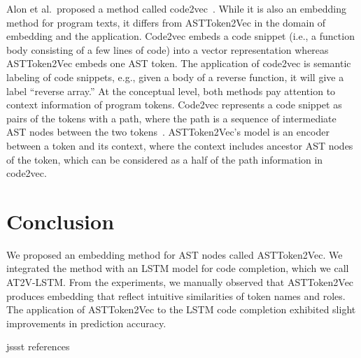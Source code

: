 \documentclass[E]{compsoft}
\begin{document}
Alon et al.~proposed a method called code2vec~\cite{alon2019popl}.  While it is also an embedding method for program texts, it differs from ASTToken2Vec in the domain of embedding and the application.  Code2vec embeds a code snippet (i.e., a function body consisting of a few lines of code) into a vector representation whereas ASTToken2Vec embeds one AST token.  The application of code2vec is semantic labeling of code snippets, e.g., given a body of a reverse function, it will give a label ``reverse array.''  At the conceptual level, both methods pay attention to context information of program tokens.  Code2vec represents a code snippet as pairs of the tokens with a path, where the path is a sequence of intermediate AST nodes between the two tokens~\cite{alon2018pldi}.  ASTToken2Vec's model is an encoder between a token and its context, where the context includes ancestor AST nodes of the token, which can be considered as a half of the path information in code2vec.  

\section{Conclusion}
We proposed an embedding method for AST nodes called ASTToken2Vec. 
We integrated the method with an LSTM model for code completion, which we call AT2V-LSTM.
From the experiments, we manually observed that ASTToken2Vec produces embedding that reflect intuitive similarities of token names and roles.
The application of ASTToken2Vec to the LSTM code completion exhibited slight improvements in prediction accuracy. %



 {jssst}
 {references}
\end{document}
